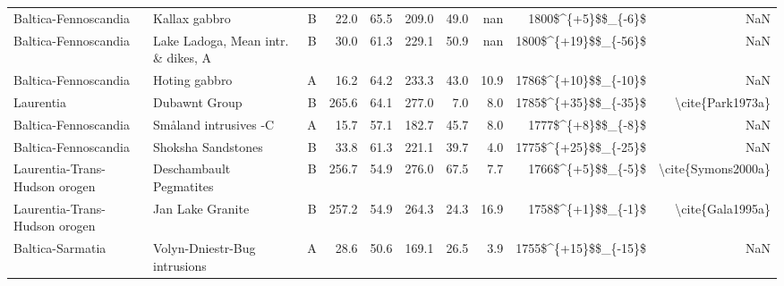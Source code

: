 \begin{longtable}{p{1 in}p{1 in}rrrrrrrr}
          Baltica-Fennoscandia &                                      Kallax gabbro &      B &      22.0 &      65.5 & 209.0 &  49.0 &       nan &     1800\$\textasciicircum \{+5\}\$\$\_\{-6\}\$ &                                                NaN \\
          Baltica-Fennoscandia &                 Lake Ladoga, Mean intr. \& dikes, A &      B &      30.0 &      61.3 & 229.1 &  50.9 &       nan &   1800\$\textasciicircum \{+19\}\$\$\_\{-56\}\$ &                                                NaN \\
          Baltica-Fennoscandia &                                      Hoting gabbro &      A &      16.2 &      64.2 & 233.3 &  43.0 &      10.9 &   1786\$\textasciicircum \{+10\}\$\$\_\{-10\}\$ &                                                NaN \\
                     Laurentia &                                      Dubawnt Group &      B &     265.6 &      64.1 & 277.0 &   7.0 &       8.0 &   1785\$\textasciicircum \{+35\}\$\$\_\{-35\}\$ &                                   \textbackslash cite\{Park1973a\} \\
          Baltica-Fennoscandia &                              Småland intrusives -C &      A &      15.7 &      57.1 & 182.7 &  45.7 &       8.0 &     1777\$\textasciicircum \{+8\}\$\$\_\{-8\}\$ &                                                NaN \\
          Baltica-Fennoscandia &                                 Shoksha Sandstones &      B &      33.8 &      61.3 & 221.1 &  39.7 &       4.0 &   1775\$\textasciicircum \{+25\}\$\$\_\{-25\}\$ &                                                NaN \\
 Laurentia-Trans-Hudson orogen &                            Deschambault Pegmatites &      B &     256.7 &      54.9 & 276.0 &  67.5 &       7.7 &     1766\$\textasciicircum \{+5\}\$\$\_\{-5\}\$ &                                 \textbackslash cite\{Symons2000a\} \\
 Laurentia-Trans-Hudson orogen &                                   Jan Lake Granite &      B &     257.2 &      54.9 & 264.3 &  24.3 &      16.9 &     1758\$\textasciicircum \{+1\}\$\$\_\{-1\}\$ &                                   \textbackslash cite\{Gala1995a\} \\
              Baltica-Sarmatia &                       Volyn-Dniestr-Bug intrusions &      A &      28.6 &      50.6 & 169.1 &  26.5 &       3.9 &   1755\$\textasciicircum \{+15\}\$\$\_\{-15\}\$ &                                                NaN \\

\end{longtable}
